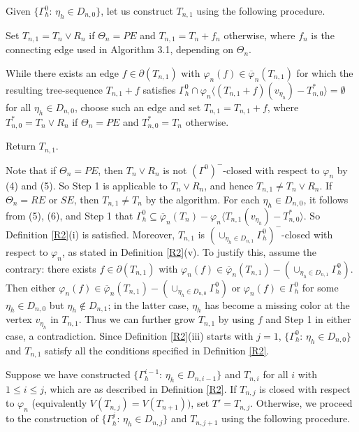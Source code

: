 \documentclass[11pt]{article}
\newcommand{\phibar}{\overline{\varphi}}
\begin{document}
Given  $\{\Gamma^0_h:\, \eta_h\in D_{n,0}\}$, let us construct $T_{n,1}$ using the following procedure.


\vskip 3mm
\vskip 2mm
 Set $T_{n,1}= T_{n}\vee R_n$ if $\Theta_n=PE$ and $T_{n,1}=T_n+f_n$ otherwise, 
where $f_n$ is the connecting edge used in Algorithm 3.1, depending on $\Theta_n$. 

\vskip 2mm
 While there exists an edge $f\in\partial(T_{n,1})$ with $\varphi_n(f)\in\phibar_n(T_{n,1})$ for which the resulting tree-sequence $T_{n,1}+f$ satisfies 
$\Gamma^{0}_h \cap \varphi_n \langle (T_{n,1}+f)(v_{\eta_h})-T_{n,0}^* \rangle =\emptyset$ for all $\eta_h\in D_{n,0}$, choose such an edge and set $T_{n,1}=T_{n,1}+f$, where $T_{n,0}^*= T_{n}\vee R_n$ if $\Theta_n=PE$ and
$T_{n,0}^*= T_{n}$ otherwise.

\vskip 2mm
 Return $T_{n, 1}$. 

\vskip 3mm
Note that if $\Theta_n=PE$, then $T_{n}\vee R_n$ is not $(\Gamma^0)^-$-closed with respect to $\varphi_n$ by (4) and (5). 
So Step 1 is applicable to $T_{n}\vee R_n$, and hence $T_{n,1}\ne  T_{n}\vee R_n$. If $\Theta_n=RE$ or $SE$, then 
$T_{n,1}\ne  T_{n}$ by the algorithm.  For each $\eta_h\in D_{n,0}$, it follows from (5), (6), and Step 1 that $\Gamma^{0}_h
\subseteq \phibar_n(T_n)- \varphi_n \langle T_{n,1}(v_{\eta_h})- T_{n,0}^*  \rangle $. So  
Definition \ref{R2}(i) is satisfied. Moreover, $T_{n,1}$ is $(\cup_{\eta_h\in D_{n,1}}\Gamma^{0}_h)^-$-closed with 
respect to $\varphi_n$, as stated in Definition \ref{R2}(v). To justify this, assume the contrary: there exists 
$f\in\partial(T_{n,1})$ with $\varphi_n(f) \in \phibar_n(T_{n,1})- (\cup_{\eta_h\in D_{n,1}} \Gamma^{0}_h)$. Then either 
$\varphi_n(f) \in \phibar_n(T_{n,1})- (\cup_{\eta_h\in D_{n,0}} \Gamma^{0}_h)$ or $\varphi_n(f) \in \Gamma^{0}_h$ for some 
$\eta_h\in D_{n,0}$ but $\eta_h\notin D_{n,1}$; in the latter case, ${\eta_h}$ has become a missing color at the vertex $v_{\eta_h}$ in $T_{n,1}$. 
Thus we can further grow $T_{n,1}$ by using $f$ and Step 1 in either case, a contradiction. Since Definition \ref{R2}(iii) starts with $j=1$, 
$\{\Gamma^{0}_h:\, \eta_h\in D_{n,0}\}$ and $T_{n,1}$ satisfy all the conditions specified in Definition \ref{R2}. 

\vskip 2mm
Suppose we have constructed  $\{\Gamma^{i-1}_h:\, \eta_h\in D_{n,i-1}\}$ and $T_{n,i}$ for all $i$ with 
$1 \le i \le j$, which are as described in Definition \ref{R2}. If $T_{n,j}$ is closed with respect to
$\varphi_n$ (equivalently $V(T_{n,j})=V(T_{n+1}))$, set $T'=T_{n,j}$. Otherwise, we proceed to the construction 
of $\{\Gamma^{j}_h:\, \eta_h\in D_{n,j}\}$ and $T_{n,j+1}$ using the following procedure. 
\end{document}
